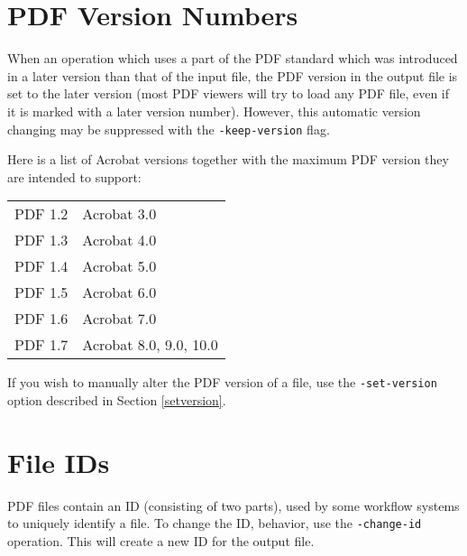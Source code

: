 \documentclass{book}
\begin{document}
\noindent{}



\section{PDF Version Numbers}
When an operation which uses a part of the PDF standard which was introduced in
a later version than that of the input file, the PDF version in the output file
is set to the later version (most PDF viewers will try to load any PDF file,
even if it is marked with a later version number). However, this automatic
version changing may be suppressed with the \texttt{-keep-version} flag.

Here is a list of Acrobat versions together with the maximum PDF version they
are intended to support:

\vspace{2mm}
  \begin{tabular}{rl}
     PDF 1.2 & Acrobat 3.0 \\
     PDF 1.3 & Acrobat 4.0 \\
     PDF 1.4 & Acrobat 5.0 \\
     PDF 1.5 & Acrobat 6.0 \\
     PDF 1.6 & Acrobat 7.0 \\
     PDF 1.7 & Acrobat 8.0, 9.0, 10.0
  \end{tabular}
\vspace{2mm}

\noindent If you wish to manually alter the PDF version of a file, use the
\texttt{-set-version} option described in Section \ref{setversion}.

\section{File IDs}
PDF files contain an ID (consisting of two parts), used by some workflow
systems to uniquely identify a file. To change the ID, behavior, use the
\texttt{-change-id} operation. This will create a new ID for the output file. 

\noindent{}
\end{document}
